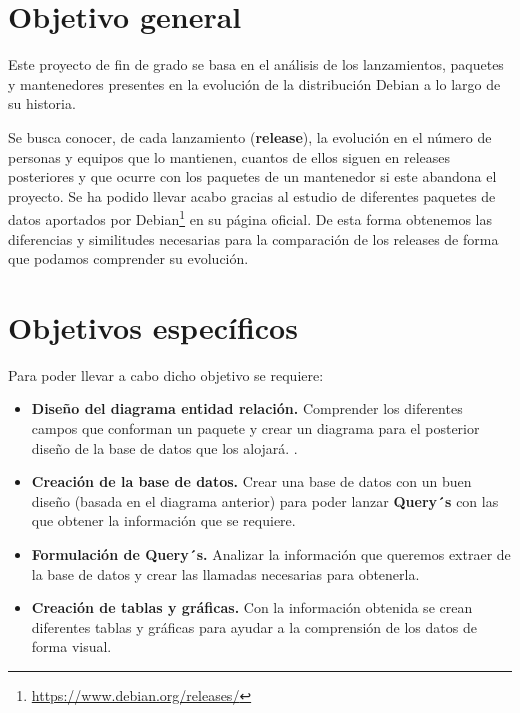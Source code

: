 \documentclass[a4paper, 12pt]{book}
\begin{document}
\section{Objetivo general} %
\label{sec:objetivo-general} %

Este proyecto de fin de grado se basa en el análisis de los lanzamientos, paquetes y mantenedores presentes en la evolución de la distribución Debian a lo largo de su historia. 

Se busca conocer, de cada lanzamiento (\textbf{release}), la evolución en el número de personas y equipos que lo mantienen,  cuantos de ellos siguen en releases posteriores y que ocurre con los paquetes de un mantenedor si este abandona el proyecto. Se ha podido llevar acabo gracias al estudio de diferentes paquetes de datos aportados por Debian\footnote{\url{https://www.debian.org/releases/}} en su página oficial.
De esta forma obtenemos las diferencias y similitudes necesarias para la comparación de los releases de forma que podamos comprender su evolución.


\section{Objetivos específicos}
\label{sec:objetivos-especificos}

Para poder llevar a cabo dicho objetivo se requiere: 

\begin{itemize}
	\item \textbf {Diseño del diagrama entidad relación.} Comprender los diferentes campos que conforman un paquete y crear un diagrama para el posterior diseño de la base de datos que los alojará.
	.
	\item \textbf {Creación de la base de datos.} Crear una base de datos con un buen diseño (basada en el diagrama anterior) para poder lanzar \textbf {Query´s} con las que obtener la información que se requiere.
	
	\item \textbf {Formulación de Query´s.} Analizar la información que queremos extraer de la base de datos y crear las llamadas necesarias para obtenerla.
	
	
	\item \textbf {Creación de tablas y gráficas.} Con la información obtenida se crean diferentes tablas y gráficas para ayudar a la comprensión de los datos de forma visual.
\end{itemize}
\end{document}
